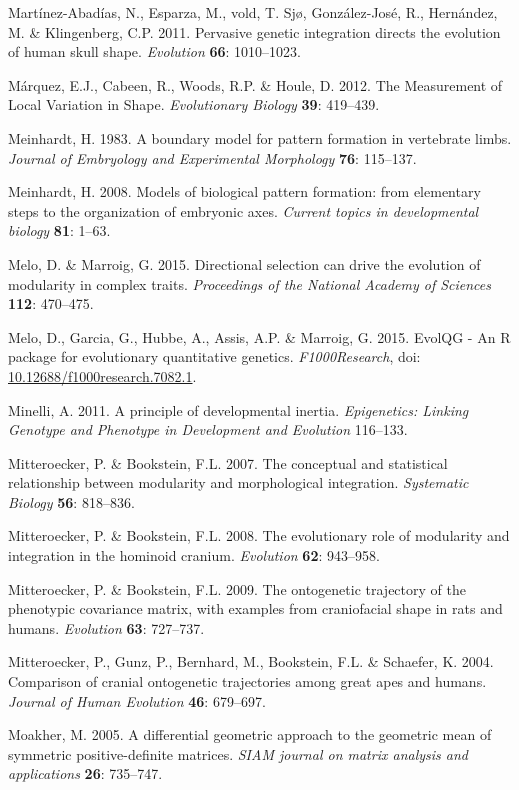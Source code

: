 \documentclass[12pt,twoside]{report}
\begin{document}
Martínez-Abadías, N., Esparza, M., vold, T. Sjø, González-José, R.,
Hernández, M. \& Klingenberg, C.P. 2011. Pervasive genetic integration
directs the evolution of human skull shape. \emph{Evolution}
\textbf{66}: 1010--1023.

Márquez, E.J., Cabeen, R., Woods, R.P. \& Houle, D. 2012. The
Measurement of Local Variation in Shape. \emph{Evolutionary Biology}
\textbf{39}: 419--439.

Meinhardt, H. 1983. A boundary model for pattern formation in vertebrate
limbs. \emph{Journal of Embryology and Experimental Morphology}
\textbf{76}: 115--137.

Meinhardt, H. 2008. Models of biological pattern formation: from
elementary steps to the organization of embryonic axes. \emph{Current
topics in developmental biology} \textbf{81}: 1--63.

Melo, D. \& Marroig, G. 2015. Directional selection can drive the
evolution of modularity in complex traits. \emph{Proceedings of the
National Academy of Sciences} \textbf{112}: 470--475.

Melo, D., Garcia, G., Hubbe, A., Assis, A.P. \& Marroig, G. 2015. EvolQG
- An R package for evolutionary quantitative genetics.
\emph{F1000Research}, doi:
\href{http://dx.doi.org/10.12688/f1000research.7082.1}{10.12688/f1000research.7082.1}.

Minelli, A. 2011. A principle of developmental inertia.
\emph{Epigenetics: Linking Genotype and Phenotype in Development and
Evolution} 116--133.

Mitteroecker, P. \& Bookstein, F.L. 2007. The conceptual and statistical
relationship between modularity and morphological integration.
\emph{Systematic Biology} \textbf{56}: 818--836.

Mitteroecker, P. \& Bookstein, F.L. 2008. The evolutionary role of
modularity and integration in the hominoid cranium. \emph{Evolution}
\textbf{62}: 943--958.

Mitteroecker, P. \& Bookstein, F.L. 2009. The ontogenetic trajectory of
the phenotypic covariance matrix, with examples from craniofacial shape
in rats and humans. \emph{Evolution} \textbf{63}: 727--737.

Mitteroecker, P., Gunz, P., Bernhard, M., Bookstein, F.L. \& Schaefer,
K. 2004. Comparison of cranial ontogenetic trajectories among great apes
and humans. \emph{Journal of Human Evolution} \textbf{46}: 679--697.

Moakher, M. 2005. A differential geometric approach to the geometric
mean of symmetric positive-definite matrices. \emph{SIAM journal on
matrix analysis and applications} \textbf{26}: 735--747.
\end{document}
